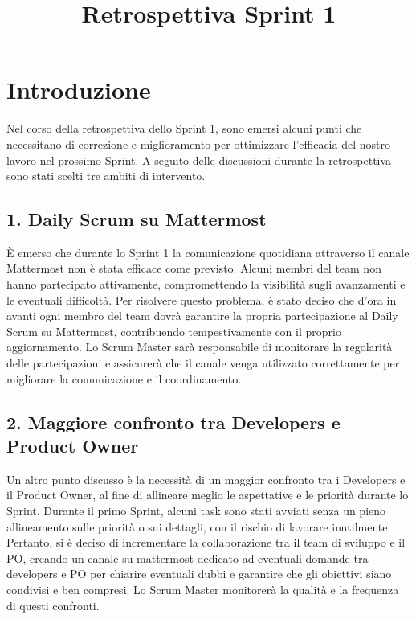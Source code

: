 \documentclass[a4paper,12pt]{article}
\title{Retrospettiva Sprint 1}
\author{}
\date{}
\begin{document}
\maketitle

\section*{Introduzione}
Nel corso della retrospettiva dello Sprint 1, sono emersi alcuni punti che necessitano di correzione e miglioramento per ottimizzare l'efficacia del nostro lavoro nel prossimo Sprint. A seguito delle discussioni durante la retrospettiva sono stati scelti tre ambiti di intervento.



\subsection*{1. Daily Scrum su Mattermost}
È emerso che durante lo Sprint 1 la comunicazione quotidiana attraverso il canale Mattermost non è stata efficace come previsto. Alcuni membri del team non hanno partecipato attivamente, compromettendo la visibilità sugli avanzamenti e le eventuali difficoltà. Per risolvere questo problema, è stato deciso che d'ora in avanti ogni membro del team dovrà garantire la propria partecipazione al Daily Scrum su Mattermost, contribuendo tempestivamente con il proprio aggiornamento. Lo Scrum Master sarà responsabile di monitorare la regolarità delle partecipazioni e assicurerà che il canale venga utilizzato correttamente per migliorare la comunicazione e il coordinamento.

\subsection*{2. Maggiore confronto tra Developers e Product Owner}
Un altro punto discusso è la necessità di un maggior confronto tra i Developers e il Product Owner, al fine di allineare meglio le aspettative e le priorità durante lo Sprint. Durante il primo Sprint, alcuni task sono stati avviati senza un pieno allineamento sulle priorità o sui dettagli, con il rischio di lavorare inutilmente. Pertanto, si è deciso di incrementare la collaborazione tra il team di sviluppo e il PO, creando un canale su mattermost dedicato ad eventuali domande tra developers e PO per chiarire eventuali dubbi e garantire che gli obiettivi siano condivisi e ben compresi. Lo Scrum Master monitorerà la qualità e la frequenza di questi confronti.
\end{document}
